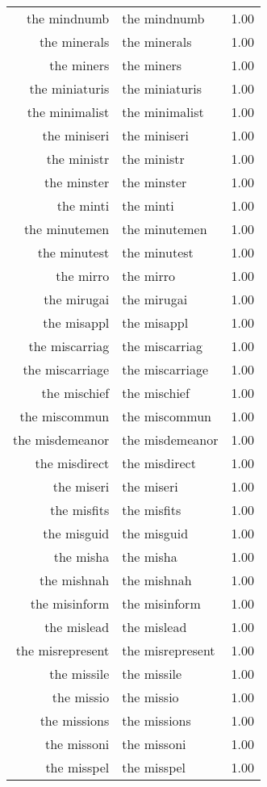 \begin{table}[ht]
\begin{tabular}{rlr}
  the mindnumb & the mindnumb & 1.00 \\ 
  the minerals & the minerals & 1.00 \\ 
  the miners & the miners & 1.00 \\ 
  the miniaturis & the miniaturis & 1.00 \\ 
  the minimalist & the minimalist & 1.00 \\ 
  the miniseri & the miniseri & 1.00 \\ 
  the ministr & the ministr & 1.00 \\ 
  the minster & the minster & 1.00 \\ 
  the minti & the minti & 1.00 \\ 
  the minutemen & the minutemen & 1.00 \\ 
  the minutest & the minutest & 1.00 \\ 
  the mirro & the mirro & 1.00 \\ 
  the mirugai & the mirugai & 1.00 \\ 
  the misappl & the misappl & 1.00 \\ 
  the miscarriag & the miscarriag & 1.00 \\ 
  the miscarriage & the miscarriage & 1.00 \\ 
  the mischief & the mischief & 1.00 \\ 
  the miscommun & the miscommun & 1.00 \\ 
  the misdemeanor & the misdemeanor & 1.00 \\ 
  the misdirect & the misdirect & 1.00 \\ 
  the miseri & the miseri & 1.00 \\ 
  the misfits & the misfits & 1.00 \\ 
  the misguid & the misguid & 1.00 \\ 
  the misha & the misha & 1.00 \\ 
  the mishnah & the mishnah & 1.00 \\ 
  the misinform & the misinform & 1.00 \\ 
  the mislead & the mislead & 1.00 \\ 
  the misrepresent & the misrepresent & 1.00 \\ 
  the missile & the missile & 1.00 \\ 
  the missio & the missio & 1.00 \\ 
  the missions & the missions & 1.00 \\ 
  the missoni & the missoni & 1.00 \\ 
  the misspel & the misspel & 1.00 \\ 

\end{tabular}
\end{table}
